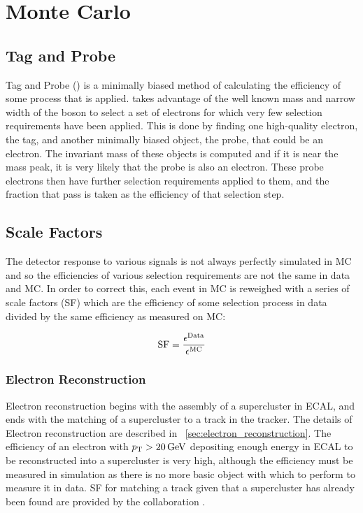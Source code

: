 \chapter{Monte Carlo}
\label{chatper:monte_carlo}

\section{Tag and Probe}

Tag and Probe (\TnP) is a minimally biased method of calculating the efficiency
of some process that is applied. \TnP takes advantage of the well known mass
and narrow width of the \Z boson to select a set of electrons for which very
few selection requirements have been applied. This is done by finding one
high-quality electron, the tag, and another minimally biased object, the probe,
that could be an electron. The invariant mass of these objects is computed and
if it is near the \Z mass peak, it is very likely that the probe is also an
electron. These probe electrons then have further selection requirements
applied to them, and the fraction that pass is taken as the efficiency of that
selection step.

\section{Scale Factors}

The detector response to various signals is not always perfectly simulated in
MC and so the efficiencies of various selection requirements are not the same
in data and MC. In order to correct this, each event in MC is reweighed with a
series of scale factors (SF) which are the efficiency of some selection process
in data divided by the same efficiency as measured on MC:

\begin{equation}
    \label{eq:sf}
    \text{SF} = \frac{\epsilon^{\text{Data}}}{\epsilon^{\text{MC}}}
\end{equation}

\subsection{Electron Reconstruction}
\label{ssec:sf_reconstruction}

Electron reconstruction begins with the assembly of a supercluster in ECAL, and
ends with the matching of a supercluster to a track in the tracker. The details
of Electron reconstruction are described in
\SEC~\ref{sec:electron_reconstruction}. The efficiency of an electron with $p_{\mathrm{T}}
> 20 \,\text{Ge\hspace{-.08em}V}$ depositing enough energy in ECAL to be reconstructed into a
supercluster is very high, although the efficiency must be measured in
simulation as there is no more basic object with which to perform \TnP to
measure it in data. SF for matching a track given that a supercluster has
already been found are provided by the collaboration
\cite{gsf_scale_factors_2013}.

